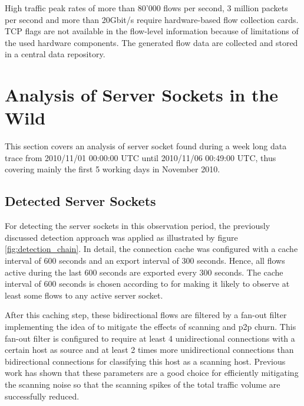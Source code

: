 High traffic peak rates of more than 80'000 flows per second, 3 million packets per second and more than 20Gbit/s require hardware-based flow collection cards\citep{Schatzmann:Tracing}. 
\gls{TCP} flags are not available in the flow-level information because of limitations of the used hardware components\citep{Schatzmann:Tracing}. 
The generated flow data are collected and stored in a central data repository.



\section{Analysis of Server Sockets in the Wild}

This section covers an analysis of \gls{server socket} found during a week long data trace from 2010/11/01 00:00:00 UTC until 2010/11/06 00:49:00 UTC, thus covering mainly the first 5 working days in November 2010.

\subsection{Detected Server Sockets}

For detecting the \glspl{server socket} in this observation period, the previously discussed detection approach was applied as illustrated by figure \ref{fig:detection_chain}.
In detail, the connection cache was configured with a cache interval of 600 seconds and an export interval of 300 seconds. Hence, all flows active during the last 600 seconds are exported every 300 seconds. The cache interval of 600 seconds is chosen according to \citet{Schatzmann:Tracing} for making it likely to observe at least some flows to any active server socket. 

After this caching step, these bidirectional flows are filtered by a fan-out filter implementing the idea of \citet{Allman:2007} to mitigate the effects of scanning and \gls{p2p} churn. 
This fan-out filter is configured to require at least 4 unidirectional connections with a certain host as source and at least 2 times more unidirectional connections than bidirectional connections for classifying this host as a scanning host.
Previous work\citep{Schatzmann:Mining,Schatzmann:Dissection, Schatzmann:Tracing} has shown that these parameters are a good choice for efficiently mitigating the scanning noise so that the scanning spikes of the total traffic volume are successfully reduced.


